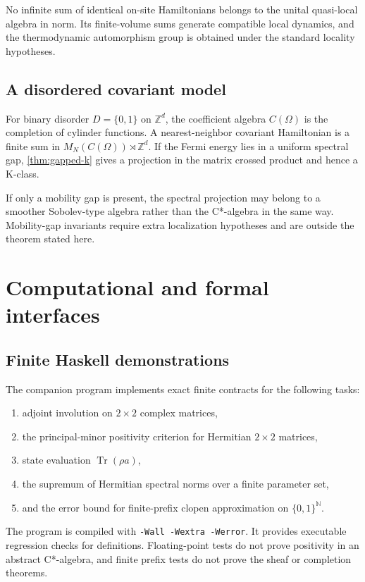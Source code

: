 \documentclass[12pt]{article}
\theoremstyle{definition}
\theoremstyle{remark}
\newcommand{\Z}{\mathbb Z}
\newcommand{\N}{\mathbb N}
\begin{document}
No infinite sum of identical on-site Hamiltonians belongs to the unital quasi-local
algebra in norm.  Its finite-volume sums generate compatible local dynamics, and the
thermodynamic automorphism group is obtained under the standard locality hypotheses.

\subsection{A disordered covariant model}

For binary disorder $D=\{0,1\}$ on $\Z^d$, the coefficient algebra $C(\Omega)$ is
the completion of cylinder functions.  A nearest-neighbor covariant Hamiltonian is a
finite sum in $M_N(C(\Omega))\rtimes\Z^d$.  If the Fermi energy lies in a uniform
spectral gap, \cref{thm:gapped-k} gives a projection in the matrix crossed product
and hence a K-class.

If only a mobility gap is present, the spectral projection may belong to a smoother
Sobolev-type algebra rather than the C*-algebra in the same way.  Mobility-gap
invariants require extra localization hypotheses and are outside the theorem stated
here.

\section{Computational and formal interfaces}

\subsection{Finite Haskell demonstrations}

The companion program implements exact finite contracts for the following tasks:

\begin{enumerate}[leftmargin=2em]
\item adjoint involution on $2\times2$ complex matrices,
\item the principal-minor positivity criterion for Hermitian $2\times2$ matrices,
\item state evaluation $\operatorname{Tr}(\rho a)$,
\item the supremum of Hermitian spectral norms over a finite parameter set,
\item and the error bound for finite-prefix clopen approximation on
  $\{0,1\}^{\N}$.
\end{enumerate}

The program is compiled with \texttt{-Wall -Wextra -Werror}.  It provides executable
regression checks for definitions.  Floating-point tests do not prove positivity in
an abstract C*-algebra, and finite prefix tests do not prove the sheaf or completion
theorems.
\end{document}
